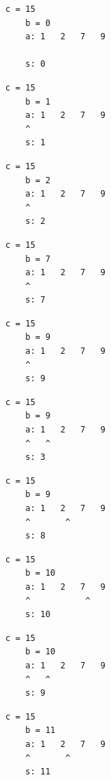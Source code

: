 {
}

{ \begin{verbatim}
    c = 15
        b = 0
        a: 1   2   7   9

        s: 0
        \end{verbatim} }

{ \begin{verbatim}
    c = 15
        b = 1
        a: 1   2   7   9
        ^
        s: 1
        \end{verbatim} }

{ \begin{verbatim}
    c = 15
        b = 2
        a: 1   2   7   9
        ^
        s: 2
        \end{verbatim} }

{ \begin{verbatim}
    c = 15
        b = 7
        a: 1   2   7   9
        ^
        s: 7
        \end{verbatim} }

{ \begin{verbatim}
    c = 15
        b = 9
        a: 1   2   7   9
        ^
        s: 9
        \end{verbatim} }

{ \begin{verbatim}
    c = 15
        b = 9
        a: 1   2   7   9
        ^   ^            
        s: 3
        \end{verbatim} }

{ \begin{verbatim}
    c = 15
        b = 9
        a: 1   2   7   9
        ^       ^        
        s: 8
        \end{verbatim} }

{ \begin{verbatim}
    c = 15
        b = 10
        a: 1   2   7   9
        ^           ^    
        s: 10
        \end{verbatim} }

{ \begin{verbatim}
    c = 15
        b = 10
        a: 1   2   7   9
        ^   ^        
        s: 9
        \end{verbatim} }

{ \begin{verbatim}
    c = 15
        b = 11
        a: 1   2   7   9
        ^       ^    
        s: 11
        \end{verbatim} }

